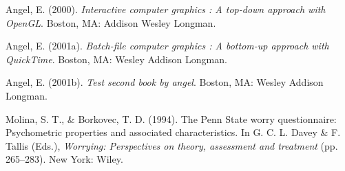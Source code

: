 \documentclass[12pt,oneside]{tisemthesis}
\newlength{\cslhangindent}
\newenvironment{CSLReferences}[2] %
 {%
  \setlength{\parindent}{0pt}
  \ifodd #1 \everypar{\setlength{\hangindent}{\cslhangindent}}\ignorespaces\fi
  \ifnum #2 > 0
  \setlength{\parskip}{#2\baselineskip}
  \fi
 }%
 {}
\begin{document}
\hypertarget{refs}{}
\begin{CSLReferences}{1}{0}
\leavevmode{}%
Angel, E. (2000). \emph{Interactive computer graphics : A top-down approach with OpenGL}. Boston, MA: Addison Wesley Longman.

\leavevmode{}%
Angel, E. (2001a). \emph{Batch-file computer graphics : A bottom-up approach with QuickTime}. Boston, MA: Wesley Addison Longman.

\leavevmode{}%
Angel, E. (2001b). \emph{Test second book by angel}. Boston, MA: Wesley Addison Longman.

\leavevmode{}%
Molina, S. T., \& Borkovec, T. D. (1994). The {P}enn {S}tate worry questionnaire: Psychometric properties and associated characteristics. In G. C. L. Davey \& F. Tallis (Eds.), \emph{Worrying: Perspectives on theory, assessment and treatment} (pp. 265--283). New York: Wiley.

\end{CSLReferences}

\end{document}
